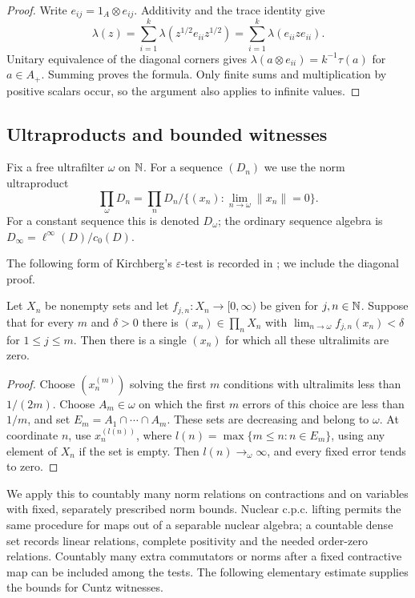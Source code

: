 \begin{proof}
Write $e_{ij}=1_A\otimes e_{ij}$.  Additivity and the trace identity give
\[
 \lambda(z)
 =\sum_{i=1}^k\lambda(z^{1/2}e_{ii}z^{1/2})
 =\sum_{i=1}^k\lambda(e_{ii}ze_{ii}).
\]
Unitary equivalence of the diagonal corners gives
$\lambda(a\otimes e_{ii})=k^{-1}\tau(a)$ for $a\in A_+$.
Summing proves the formula.  Only finite sums and multiplication by
positive scalars occur, so the argument also applies to infinite values.
\end{proof}

\subsection{Ultraproducts and bounded witnesses}

Fix a free ultrafilter $\omega$ on $\mathbb N$.  For a sequence $(D_n)$ we use
the norm ultraproduct
\[
 \prod_\omega D_n
 =\prod_nD_n\big/\{(x_n):\lim_{n\to\omega}\|x_n\|=0\}.
\]
For a constant sequence this is denoted $D_\omega$; the ordinary
sequence algebra is $D_\infty=\ell^\infty(D)/c_0(D)$.

The following form of Kirchberg's $\varepsilon$-test is recorded in
\cite[Lemma~1.10]{BBSTWW}; we include the diagonal proof.

\begin{lemma}
\label{prelim:epsilon-test}
Let $X_n$ be nonempty sets and let
$f_{j,n}:X_n\to[0,\infty)$ be given for $j,n\in\mathbb N$.
Suppose that for every $m$ and $\delta>0$ there is
$(x_n)\in\prod_nX_n$ with
$\lim_{n\to\omega}f_{j,n}(x_n)<\delta$ for $1\le j\le m$.
Then there is a single $(x_n)$ for which all these ultralimits are zero.
\end{lemma}

\begin{proof}
Choose $(x_n^{(m)})$ solving the first $m$ conditions with ultralimits
less than $1/(2m)$.  Choose $A_m\in\omega$ on which the first $m$
errors of this choice are less than $1/m$, and set
$E_m=A_1\cap\cdots\cap A_m$.  These sets are decreasing and belong
to $\omega$.
At coordinate $n$, use $x_n^{(l(n))}$, where
$l(n)=\max\{m\le n:n\in E_m\}$, using any element of $X_n$ if the
set is empty.  Then $l(n)\to_\omega\infty$, and every fixed error tends
to zero.
\end{proof}

We apply this to countably many norm relations on contractions and on
variables with fixed, separately prescribed norm bounds.  Nuclear
c.p.c. lifting permits the same procedure for maps out of a separable
nuclear algebra; a countable dense set records linear relations,
complete positivity and the needed order-zero relations.  Countably
many extra commutators or norms after a fixed contractive map can be
included among the tests.  The following elementary estimate supplies
the bounds for Cuntz witnesses.

